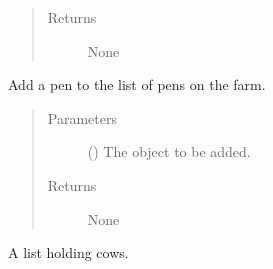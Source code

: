 \documentclass[letterpaper,10pt,english]{sphinxmanual}
\begin{document}
\begin{fulllineitems}
\begin{fulllineitems}
\begin{quote}
\begin{description}
\item[{Returns}] \leavevmode
\sphinxAtStartPar
None

\end{description}\end{quote}

\end{fulllineitems}


\begin{fulllineitems}
\label{\detokenize{farming:farming.farm1.Farm.add_pen}}
\sphinxAtStartPar
Add a pen to the list of pens on the farm.
\begin{quote}\begin{description}
\item[{Parameters}] \leavevmode
\sphinxAtStartPar
{} ({\hyperref[\detokenize{farming:farming.farm1.Pen}]{}}) \textendash{} The  object to be added.

\item[{Returns}] \leavevmode
\sphinxAtStartPar
None

\end{description}\end{quote}

\end{fulllineitems}


\begin{fulllineitems}
\label{\detokenize{farming:farming.farm1.Farm.cows}}
\sphinxAtStartPar
A list holding cows.

\end{fulllineitems}



\end{fulllineitems}
\end{document}
